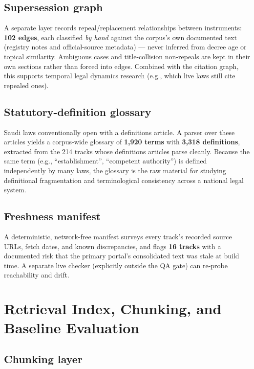\documentclass[11pt]{article}
\begin{document}
\subsection{Supersession graph}

A separate layer records repeal/replacement relationships between
instruments: \textbf{102 edges}, each classified \emph{by hand} against the
corpus's own documented text (registry notes and official-source metadata)
--- never inferred from decree age or topical similarity. Ambiguous cases
and title-collision non-repeals are kept in their own sections rather than
forced into edges. Combined with the citation graph, this supports temporal
legal dynamics research (e.g., which live laws still cite repealed ones).

\subsection{Statutory-definition glossary}

Saudi laws conventionally open with a definitions article. A parser over
these articles yields a corpus-wide glossary of \textbf{1{,}920 terms} with
\textbf{3{,}318 definitions}, extracted from the 214 tracks whose
definitions articles parse cleanly. Because the same term (e.g.,
``establishment'', ``competent authority'') is defined independently by
many laws, the glossary is the raw material for studying definitional
fragmentation and terminological consistency across a national legal
system.

\subsection{Freshness manifest}

A deterministic, network-free manifest surveys every track's recorded
source URLs, fetch dates, and known discrepancies, and flags \textbf{16
tracks} with a documented risk that the primary portal's consolidated text
was stale at build time. A separate live checker (explicitly outside the QA
gate) can re-probe reachability and drift.

\section{Retrieval Index, Chunking, and Baseline Evaluation}
\label{sec:retrieval}

\subsection{Chunking layer}
\end{document}
